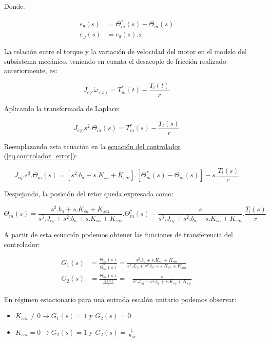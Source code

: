 \documentclass{article}
\begin{document}
Donde:

\begin{align*}
    e_\theta(s) &= \Theta_m^*(s) - \Theta_m(s) \\
    e_\omega(s) &= e_\theta(s).s
\end{align*}

La relación entre el torque y la variación de velocidad del motor en el modelo del subsistema mecánico, 
teniendo en cuanta el desacople de fricción realizado anteriormente, es:

\begin{equation}
    J_{eq}.\dot{\omega}_(t) = T_m^*(t) - \frac{T_l(t)}{r}
\end{equation}

Aplicando la transformada de Laplace:

\begin{equation}
    J_{eq}.s^2.\Theta_m(s) = T_m^*(s) - \frac{T_l(s)}{r}
\end{equation}

Reemplazando esta ecuación en la
\hyperref[eq.controlador_error]{ecuación del controlador (\ref*{eq.controlador_error})}:

\begin{equation}
    J_{eq}.s^3.\Theta_m(s) = [s^2.b_a + s.K_{sa} + K_{sai}].[\Theta_m^*(s) - \Theta_m(s)] - s.\frac{T_l(s)}{r}
\end{equation}

Despejando, la posición del retor queda expresada como:

\begin{equation}
    \Theta_m(s) = \frac{s^2.b_a + s.K_{sa} + K_{sai}}{s^3.J_{eq} + s^2.b_a + s.K_{sa} + K_{sai}}.\Theta_m^*(s) - \frac{s}{s^3.J_{eq} + s^2.b_a + s.K_{sa} + K_{sai}}.\frac{T_l(s)}{r}
\end{equation}

A partir de esta ecuación podemos obtener las funciones de transferencia del controlador:

\begin{align}
    G_1(s) &= \frac{\Theta_m(s)}{\Theta_m^*(s)} = \frac{s^2.b_a + s.K_{sa} + K_{sai}}{s^3.J_{eq} + s^2.b_a + s.K_{sa} + K_{sai}} \\
    G_2(s) &= \frac{\Theta_m(s)}{\frac{T_l(s)}{r}} = -\frac{s}{s^3.J_{eq} + s^2.b_a + s.K_{sa} + K_{sai}}
\end{align}

En régimen estacionario para una entrada escalón unitario podemos observar:

\begin{itemize}
    \item $K_{sai} \neq 0 \to G_1(s) = 1 $ y $G_2(s) = 0$
    \item $K_{sai} = 0 \to G_2(s) = 1 $ y $G_2(s) = \frac{1}{K_{sa}} $
\end{itemize}
\end{document}
